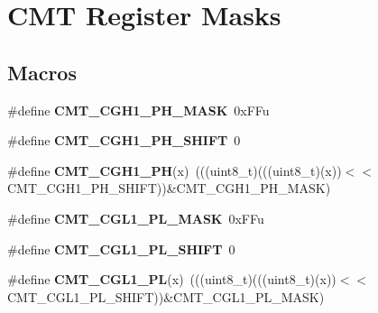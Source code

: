 \hypertarget{group__CMT__Register__Masks}{}\section{C\+MT Register Masks}
\label{group__CMT__Register__Masks}
\subsection*{Macros}
\begin{DoxyCompactItemize}
\item 
\#define {\bfseries C\+M\+T\+\_\+\+C\+G\+H1\+\_\+\+P\+H\+\_\+\+M\+A\+SK}~0x\+F\+Fu\hypertarget{group__CMT__Register__Masks_ga4ca405c6721e302fabcb4ddcc7773f1a}{}\label{group__CMT__Register__Masks_ga4ca405c6721e302fabcb4ddcc7773f1a}

\item 
\#define {\bfseries C\+M\+T\+\_\+\+C\+G\+H1\+\_\+\+P\+H\+\_\+\+S\+H\+I\+FT}~0\hypertarget{group__CMT__Register__Masks_ga6021b3f0f356c06b50371a28bf83f27e}{}\label{group__CMT__Register__Masks_ga6021b3f0f356c06b50371a28bf83f27e}

\item 
\#define {\bfseries C\+M\+T\+\_\+\+C\+G\+H1\+\_\+\+PH}(x)~(((uint8\+\_\+t)(((uint8\+\_\+t)(x))$<$$<$C\+M\+T\+\_\+\+C\+G\+H1\+\_\+\+P\+H\+\_\+\+S\+H\+I\+FT))\&C\+M\+T\+\_\+\+C\+G\+H1\+\_\+\+P\+H\+\_\+\+M\+A\+SK)\hypertarget{group__CMT__Register__Masks_gaab6db22ced1eff50005d7df4d1d6dc0f}{}\label{group__CMT__Register__Masks_gaab6db22ced1eff50005d7df4d1d6dc0f}

\item 
\#define {\bfseries C\+M\+T\+\_\+\+C\+G\+L1\+\_\+\+P\+L\+\_\+\+M\+A\+SK}~0x\+F\+Fu\hypertarget{group__CMT__Register__Masks_gab1d6a610e9cc0a024160f157f48a851f}{}\label{group__CMT__Register__Masks_gab1d6a610e9cc0a024160f157f48a851f}

\item 
\#define {\bfseries C\+M\+T\+\_\+\+C\+G\+L1\+\_\+\+P\+L\+\_\+\+S\+H\+I\+FT}~0\hypertarget{group__CMT__Register__Masks_gaa7bf093c1ef1bfd7e40a2740eafb093d}{}\label{group__CMT__Register__Masks_gaa7bf093c1ef1bfd7e40a2740eafb093d}

\item 
\#define {\bfseries C\+M\+T\+\_\+\+C\+G\+L1\+\_\+\+PL}(x)~(((uint8\+\_\+t)(((uint8\+\_\+t)(x))$<$$<$C\+M\+T\+\_\+\+C\+G\+L1\+\_\+\+P\+L\+\_\+\+S\+H\+I\+FT))\&C\+M\+T\+\_\+\+C\+G\+L1\+\_\+\+P\+L\+\_\+\+M\+A\+SK)\hypertarget{group__CMT__Register__Masks_ga2d042e508373d5fceb72b794eca5e7d1}{}\label{group__CMT__Register__Masks_ga2d042e508373d5fceb72b794eca5e7d1}


\end{DoxyCompactItemize}
